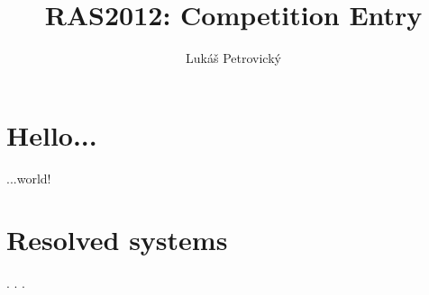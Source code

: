 \documentclass[10pt,a4paper,draft]{article}
\author{Lukáš Petrovický}
\title{RAS2012: Competition Entry}
\begin{document}
\maketitle
\listoffigures
\listoftables
\tableofcontents
 
\section{Hello...}

...world!

\appendix

\section{Resolved systems}

.
.
.
\end{document}
